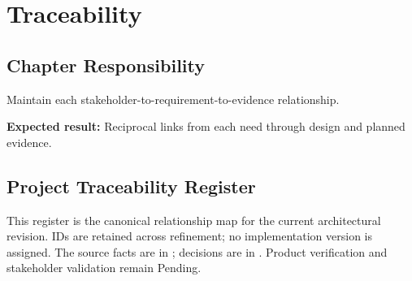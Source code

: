 \chapter{Traceability}
\section{Chapter Responsibility}
\label{Section:TraceabilityResponsibility}
Maintain each stakeholder-to-requirement-to-evidence relationship.

\noindent\textbf{Expected result:} Reciprocal links from each need through design and planned evidence.

\section{Project Traceability Register}
This register is the canonical relationship map for the current architectural revision. IDs are retained across refinement; no implementation version is assigned. The source facts are in ; decisions are in . Product verification and stakeholder validation remain Pending.

